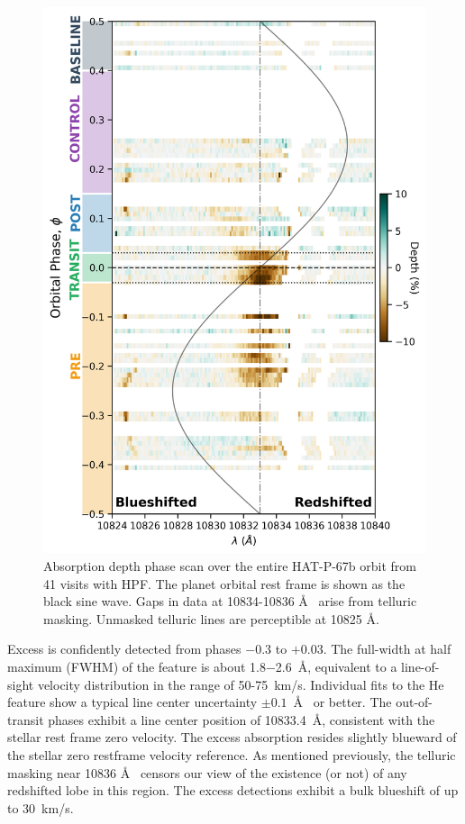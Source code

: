 \documentclass[linenumbers, twocolumn, trackchanges]{aastex631}
\begin{document}
\begin{figure}
  \includegraphics[width=\linewidth]{phase_2D_diagram_resid.png}
  \caption{Absorption depth phase scan over the entire HAT-P-67b orbit from 41 visits with HPF.  The planet orbital rest frame is shown as the black sine wave. Gaps in data at 10834-10836 \AA~ arise from telluric masking.  Unmasked telluric lines are perceptible at 10825 \AA.}
  \label{fig:HPFscanResid}
\end{figure}

Excess is confidently detected from phases $-$0.3 to $+$0.03.  The full-width at half maximum (FWHM) of the feature is about 1.8$-$2.6~\AA, equivalent to a line-of-sight velocity distribution in the range of 50-75~km/s.  Individual fits to the He feature show a typical line center uncertainty $\pm0.1$~\AA~ or better.  The out-of-transit phases exhibit a line center position of 10833.4~\AA, consistent with the stellar  rest frame zero velocity.  The excess absorption resides slightly blueward of the stellar zero restframe velocity reference.  As mentioned previously, the telluric masking near 10836 \AA~ censors our view of the existence (or not) of any redshifted lobe in this region.  The excess detections exhibit a bulk blueshift of up to 30~km/s.
\end{document}
